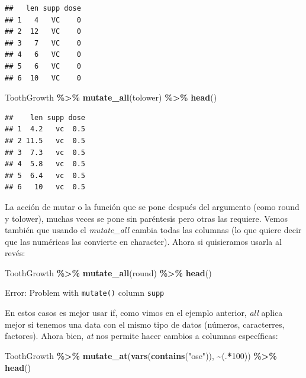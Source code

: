 \documentclass[
]{book}
\newenvironment{Shaded}{\begin{snugshade}}{\end{snugshade}}
\newcommand{\DecValTok}[1]{\textcolor[rgb]{0.00,0.00,0.81}{#1}}
\newcommand{\FunctionTok}[1]{\textcolor[rgb]{0.13,0.29,0.53}{\textbf{#1}}}
\newcommand{\NormalTok}[1]{#1}
\newcommand{\SpecialCharTok}[1]{\textcolor[rgb]{0.81,0.36,0.00}{\textbf{#1}}}
\newcommand{\StringTok}[1]{\textcolor[rgb]{0.31,0.60,0.02}{#1}}
\begin{document}
\begin{verbatim}
##   len supp dose
## 1   4   VC    0
## 2  12   VC    0
## 3   7   VC    0
## 4   6   VC    0
## 5   6   VC    0
## 6  10   VC    0
\end{verbatim}

\begin{Shaded}
\begin{Highlighting}[]
\NormalTok{ToothGrowth }\SpecialCharTok{\%\textgreater{}\%} \FunctionTok{mutate\_all}\NormalTok{(tolower) }\SpecialCharTok{\%\textgreater{}\%} \FunctionTok{head}\NormalTok{()}
\end{Highlighting}
\end{Shaded}

\begin{verbatim}
##    len supp dose
## 1  4.2   vc  0.5
## 2 11.5   vc  0.5
## 3  7.3   vc  0.5
## 4  5.8   vc  0.5
## 5  6.4   vc  0.5
## 6   10   vc  0.5
\end{verbatim}

\hfill\break
La acción de mutar o la función que se pone después del argumento (como round y tolower), muchas veces se pone sin paréntesis pero otras las requiere.
Vemos también que usando el \emph{mutate\_all} cambia todas las columnas (lo que quiere decir que las numéricas las convierte en character).
Ahora si quisieramos usarla al revés:

\begin{Shaded}
\begin{Highlighting}[]
\NormalTok{ToothGrowth }\SpecialCharTok{\%\textgreater{}\%} \FunctionTok{mutate\_all}\NormalTok{(round) }\SpecialCharTok{\%\textgreater{}\%} \FunctionTok{head}\NormalTok{()}
\end{Highlighting}
\end{Shaded}

Error: Problem with \texttt{mutate()} column \texttt{supp}

\hfill\break
En estos casos es mejor usar if, como vimos en el ejemplo anterior, \emph{all} aplica mejor si tenemos una data con el mismo tipo de datos (números, caracterres, factores).
Ahora bien, \emph{at} nos permite hacer cambios a columnas específicas:

\begin{Shaded}
\begin{Highlighting}[]
\NormalTok{ToothGrowth }\SpecialCharTok{\%\textgreater{}\%}  \FunctionTok{mutate\_at}\NormalTok{(}\FunctionTok{vars}\NormalTok{(}\FunctionTok{contains}\NormalTok{(}\StringTok{"ose"}\NormalTok{)), }\SpecialCharTok{\textasciitilde{}}\NormalTok{(.}\SpecialCharTok{*}\DecValTok{100}\NormalTok{)) }\SpecialCharTok{\%\textgreater{}\%} \FunctionTok{head}\NormalTok{()}
\end{Highlighting}
\end{Shaded}
\end{document}
